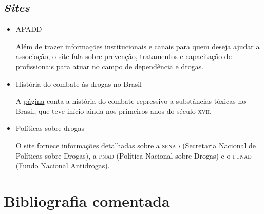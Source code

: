 \documentclass[12pt]{extarticle}
\begin{document}
\subsection{\emph{Sites}}

\begin{itemize}
\item APADD

Além de trazer informações institucionais e canais para quem deseja
ajudar a associação, o \href{http://www.apadd.org/}{site} fala sobre prevenção, tratamentos e
capacitação de profissionais para atuar no campo de dependência e
drogas.

\item História do combate às drogas no Brasil

A \href{http://www.senado.leg.br/noticias/Jornal/emdiscussao/dependencia-quimica/iniciativas-do-governo-no-combate-as-drogas/historia-do-combate-as-drogas-no-brasil.aspx}{página} conta a história do combate repressivo a substâncias tóxicas no
Brasil, que teve início ainda nos primeiros anos do século \textsc{xvii}.

\item Políticas sobre drogas

O \href{www.justica.gov.br/sua-protecao/politicas-sobre-drogas}{site} fornece informações detalhadas sobre a \textsc{senad} (Secretaria Nacional
de Políticas sobre Drogas), a \textsc{pnad} (Política Nacional sobre Drogas) e o
\textsc{funad} (Fundo Nacional Antidrogas).
\end{itemize}

\section{Bibliografia comentada}
\end{document}
